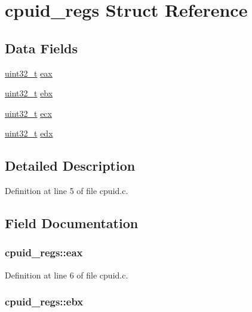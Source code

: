 \hypertarget{structcpuid__regs}{\section{cpuid\-\_\-regs \-Struct \-Reference}
\label{structcpuid__regs}
}
\subsection*{\-Data \-Fields}
\begin{DoxyCompactItemize}
\item 
\hyperlink{types_8h_a435d1572bf3f880d55459d9805097f62}{uint32\-\_\-t} \hyperlink{structcpuid__regs_aa2cb7fea4b7c7a7f5c8bacec64fa91a9}{eax}
\item 
\hyperlink{types_8h_a435d1572bf3f880d55459d9805097f62}{uint32\-\_\-t} \hyperlink{structcpuid__regs_adf5c78244293c4962e59a33b67ba7b5b}{ebx}
\item 
\hyperlink{types_8h_a435d1572bf3f880d55459d9805097f62}{uint32\-\_\-t} \hyperlink{structcpuid__regs_a61c345a6aec2b65698243b63bb284ec3}{ecx}
\item 
\hyperlink{types_8h_a435d1572bf3f880d55459d9805097f62}{uint32\-\_\-t} \hyperlink{structcpuid__regs_af071577d6f7f2ceb97e0f39d155cfaad}{edx}
\end{DoxyCompactItemize}


\subsection{\-Detailed \-Description}


\-Definition at line 5 of file cpuid.\-c.



\subsection{\-Field \-Documentation}
\hypertarget{structcpuid__regs_aa2cb7fea4b7c7a7f5c8bacec64fa91a9}{
\subsubsection[{eax}]{ {\bf cpuid\-\_\-regs\-::eax}}}\label{structcpuid__regs_aa2cb7fea4b7c7a7f5c8bacec64fa91a9}


\-Definition at line 6 of file cpuid.\-c.

\hypertarget{structcpuid__regs_adf5c78244293c4962e59a33b67ba7b5b}{
\subsubsection[{ebx}]{ {\bf cpuid\-\_\-regs\-::ebx}}}\label{structcpuid__regs_adf5c78244293c4962e59a33b67ba7b5b}


